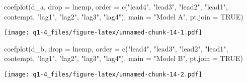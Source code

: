\documentclass[
]{article}
\newenvironment{Shaded}{\begin{snugshade}}{\end{snugshade}}
\newcommand{\AttributeTok}[1]{\textcolor[rgb]{0.77,0.63,0.00}{#1}}
\newcommand{\ConstantTok}[1]{\textcolor[rgb]{0.00,0.00,0.00}{#1}}
\newcommand{\FunctionTok}[1]{\textcolor[rgb]{0.00,0.00,0.00}{#1}}
\newcommand{\NormalTok}[1]{#1}
\newcommand{\StringTok}[1]{\textcolor[rgb]{0.31,0.60,0.02}{#1}}
\begin{document}
\begin{Shaded}
\begin{Highlighting}[]
\FunctionTok{coefplot}\NormalTok{(d\_a, }\AttributeTok{drop =} \StringTok{\textquotesingle{}lnemp\textquotesingle{}}\NormalTok{,}
         \AttributeTok{order =} \FunctionTok{c}\NormalTok{(}\StringTok{"lead4"}\NormalTok{, }\StringTok{"lead3"}\NormalTok{, }\StringTok{"lead2"}\NormalTok{, }\StringTok{"lead1"}\NormalTok{, }\StringTok{\textquotesingle{}contempt\textquotesingle{}}\NormalTok{,}
                   \StringTok{"lag1"}\NormalTok{, }\StringTok{"lag2"}\NormalTok{, }\StringTok{"lag3"}\NormalTok{, }\StringTok{"lag4"}\NormalTok{),}
         \AttributeTok{main =} \StringTok{"Model A"}\NormalTok{,}
         \AttributeTok{pt.join =} \ConstantTok{TRUE}\NormalTok{)}
\end{Highlighting}
\end{Shaded}

\texttt{[image: q1-4\_files/figure-latex/unnamed-chunk-14-1.pdf]}

\begin{Shaded}
\begin{Highlighting}[]
\FunctionTok{coefplot}\NormalTok{(d\_b, }\AttributeTok{drop =} \StringTok{\textquotesingle{}lnemp\textquotesingle{}}\NormalTok{,}
         \AttributeTok{order =} \FunctionTok{c}\NormalTok{(}\StringTok{"lead4"}\NormalTok{, }\StringTok{"lead3"}\NormalTok{, }\StringTok{"lead2"}\NormalTok{, }\StringTok{"lead1"}\NormalTok{, }\StringTok{\textquotesingle{}contempt\textquotesingle{}}\NormalTok{,}
                   \StringTok{"lag1"}\NormalTok{, }\StringTok{"lag2"}\NormalTok{, }\StringTok{"lag3"}\NormalTok{, }\StringTok{"lag4"}\NormalTok{),}
         \AttributeTok{main =} \StringTok{"Model B"}\NormalTok{,}
         \AttributeTok{pt.join =} \ConstantTok{TRUE}\NormalTok{)}
\end{Highlighting}
\end{Shaded}

\texttt{[image: q1-4\_files/figure-latex/unnamed-chunk-14-2.pdf]}
\end{document}
